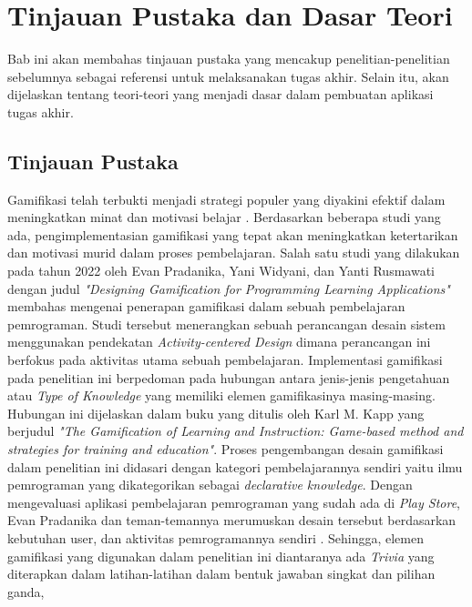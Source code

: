 \chapter{Tinjauan Pustaka dan Dasar Teori}
Bab ini akan membahas tinjauan pustaka yang mencakup penelitian-penelitian sebelumnya sebagai referensi untuk melaksanakan tugas akhir. Selain itu, akan dijelaskan tentang teori-teori yang menjadi dasar dalam pembuatan aplikasi tugas akhir.
\section{Tinjauan Pustaka}
Gamifikasi telah terbukti menjadi strategi populer yang diyakini efektif dalam meningkatkan minat dan motivasi belajar \cite{EnjoyLearningLikeGaming}. 
Berdasarkan beberapa studi yang ada, pengimplementasian gamifikasi yang tepat akan meningkatkan ketertarikan dan motivasi murid dalam proses pembelajaran.
Salah satu studi yang dilakukan pada tahun 2022 oleh Evan Pradanika, Yani Widyani, dan Yanti Rusmawati dengan judul \textit{"Designing Gamification for Programming Learning Applications"} \cite{GamificationInProgLang} membahas mengenai penerapan gamifikasi
dalam sebuah pembelajaran pemrograman. Studi tersebut menerangkan sebuah perancangan desain sistem menggunakan pendekatan \textit{Activity-centered Design} dimana perancangan ini berfokus pada aktivitas utama sebuah pembelajaran\cite{GamificationInProgLang}. 
Implementasi gamifikasi pada penelitian ini berpedoman pada hubungan antara jenis-jenis pengetahuan atau \textit{Type of Knowledge} yang memiliki elemen gamifikasinya masing-masing\cite{kapp2012gamification}.
Hubungan ini dijelaskan dalam buku yang ditulis oleh Karl M. Kapp yang berjudul \textit{"The Gamification of Learning and Instruction: Game-based method and strategies for training and education"}\cite{kapp2012gamification}.
Proses pengembangan desain gamifikasi dalam penelitian ini didasari dengan kategori pembelajarannya sendiri yaitu ilmu pemrograman yang dikategorikan sebagai \textit{declarative knowledge}.
Dengan mengevaluasi aplikasi pembelajaran pemrograman yang sudah ada di \textit{Play Store}, Evan Pradanika dan teman-temannya merumuskan desain tersebut berdasarkan kebutuhan user, dan aktivitas pemrogramannya sendiri \cite{GamificationInProgLang}.
Sehingga, elemen gamifikasi yang digunakan dalam penelitian ini diantaranya ada
\textit{Trivia} yang diterapkan dalam latihan-latihan dalam bentuk jawaban singkat dan pilihan ganda,
